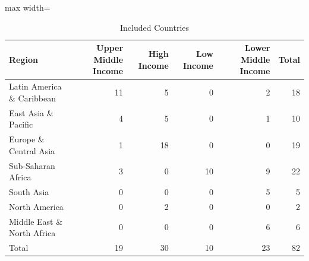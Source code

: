 \documentclass[10pt]{beamer}
\begin{document}
\begin{frame}
	\begin{table}
		\caption{Included Countries}
		\centering
		\begin{adjustbox}{max width=\textwidth}
		\begin{tabular}{lrrrrr}
			\toprule
			Region & Upper Middle Income & High Income & Low Income & Lower Middle Income & Total\\
			\midrule
			Latin America \& Caribbean & 11 & 5 & 0 & 2 & 18\\
			East Asia \& Pacific & 4 & 5 & 0 & 1 & 10\\
			Europe \& Central Asia & 1 & 18 & 0 & 0 & 19\\
			Sub-Saharan Africa & 3 & 0 & 10 & 9 & 22\\
			South Asia & 0 & 0 & 0 & 5 & 5\\
			North America & 0 & 2 & 0 & 0 & 2\\
			Middle East \& North Africa & 0 & 0 & 0 & 6 & 6\\
			Total & 19 & 30 & 10 & 23 & 82\\
			\bottomrule
		\end{tabular}
		\end{adjustbox}
	\end{table}
	
\end{frame}
\end{document}
